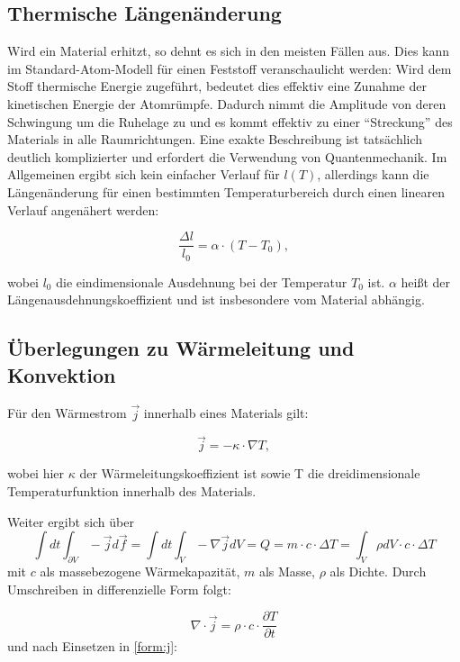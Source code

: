 \subsection{Thermische Längenänderung}
Wird ein Material erhitzt, so dehnt es sich in den meisten Fällen aus. Dies kann im Standard-Atom-Modell für einen Feststoff veranschaulicht werden: Wird dem Stoff thermische Energie zugeführt, bedeutet dies effektiv eine Zunahme der kinetischen Energie der Atomrümpfe. Dadurch nimmt die Amplitude von deren Schwingung um die Ruhelage zu und es kommt effektiv zu einer \enquote{Streckung} des Materials in alle Raumrichtungen. Eine exakte Beschreibung ist tatsächlich deutlich komplizierter und erfordert die Verwendung von Quantenmechanik. Im Allgemeinen ergibt sich kein einfacher Verlauf für $ l(T) $, allerdings kann die Längenänderung für einen bestimmten Temperaturbereich durch einen linearen Verlauf angenähert werden: 

\begin{equation}
\frac{ \Delta l}{l_{0}} = \alpha \cdot (T-T_{0}), 
\end{equation}

wobei $ l_{0} $ die eindimensionale Ausdehnung bei der Temperatur $ T_{0} $ ist. $ \alpha $ heißt der Längenausdehnungskoeffizient und ist insbesondere vom Material abhängig. 

\subsection{Überlegungen zu Wärmeleitung und Konvektion}
Für den Wärmestrom $ \vec{j} $ innerhalb eines Materials gilt: 

\begin{equation}
\vec{j} = - \kappa \cdot \nabla T, 
\label{form:j}
\end{equation}

wobei hier $ \kappa $ der Wärmeleitungskoeffizient ist sowie T die dreidimensionale Temperaturfunktion innerhalb des Materials. 

Weiter ergibt sich über
\begin{equation}
\int dt \int_{\partial V} -\vec{j} d \vec{f} = \int dt \int_{V} -\nabla \vec{j} dV = Q = m \cdot c \cdot \Delta T = \int_{V} \rho dV \cdot c \cdot \Delta T
\end{equation}
mit $c$ als massebezogene Wärmekapazität, $m$ als Masse, $\rho$ als Dichte. Durch Umschreiben in differenzielle Form folgt: 

\begin{equation}
\nabla \cdot \vec{j} = \rho \cdot c \cdot  \frac{\partial T}{\partial t}
\end{equation} 
und nach Einsetzen in \ref{form:j}: 

